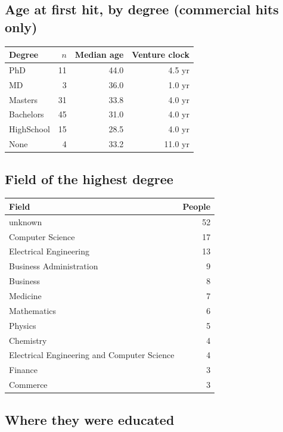 \documentclass[11pt]{article}
\begin{document}
\subsection{Age at first hit, by degree (commercial hits only)}

\begin{center}\begin{tabular}{lrrr}\toprule Degree & $n$ & Median age & Venture clock \\\midrule
PhD & 11 & 44.0 & 4.5 yr \\
MD & 3 & 36.0 & 1.0 yr \\
Masters & 31 & 33.8 & 4.0 yr \\
Bachelors & 45 & 31.0 & 4.0 yr \\
HighSchool & 15 & 28.5 & 4.0 yr \\
None & 4 & 33.2 & 11.0 yr \\
\bottomrule\end{tabular}\end{center}
\subsection{Field of the highest degree}

\begin{center}\begin{tabular}{lr}\toprule Field & People \\\midrule
unknown & 52 \\
Computer Science & 17 \\
Electrical Engineering & 13 \\
Business Administration & 9 \\
Business & 8 \\
Medicine & 7 \\
Mathematics & 6 \\
Physics & 5 \\
Chemistry & 4 \\
Electrical Engineering and Computer Science & 4 \\
Finance & 3 \\
Commerce & 3 \\
\bottomrule\end{tabular}\end{center}
\subsection{Where they were educated}
\end{document}
